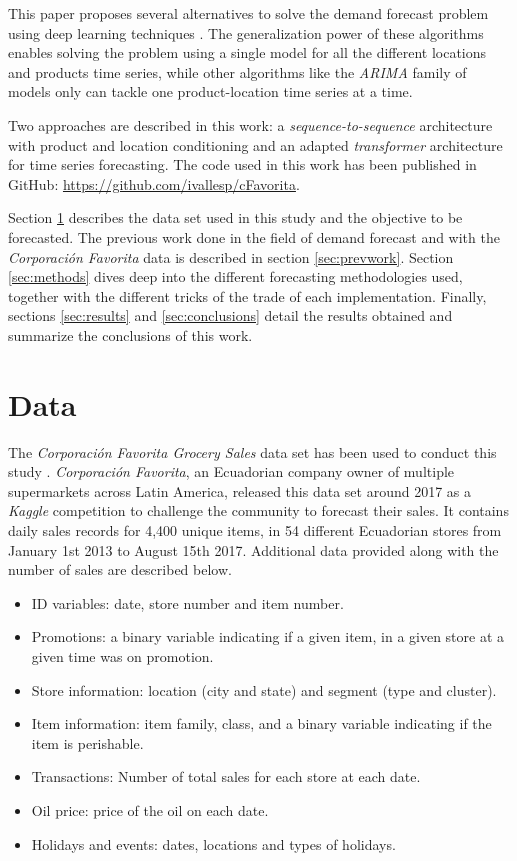 \documentclass{elsarticle}
\begin{document}
	This paper proposes several alternatives to solve the demand forecast problem using deep learning techniques \cite{Goodfellow2016}. The generalization power of these algorithms enables solving the problem using a single model for all the different locations and products time series, while other algorithms like the \textit{ARIMA} family of models \cite{Hyndman2018} only can tackle one product-location time series at a time. 
	
	Two approaches are described in this work: a \textit{sequence-to-sequence} architecture with product and location conditioning and an adapted \textit{transformer} architecture for time series forecasting. The code used in this work has been published in GitHub: \url{https://github.com/ivallesp/cFavorita}.
	
	 Section \ref{sec:data} describes the data set used in this study and the objective to be forecasted. The previous work done in the field of demand forecast and with the \textit{Corporación Favorita} data is described in section \ref{sec:prevwork}. Section \ref{sec:methods} dives deep into the different forecasting methodologies used, together with the different tricks of the trade of each implementation. 
	Finally, sections \ref{sec:results} and \ref{sec:conclusions} detail the results obtained and summarize the conclusions of this work.
	
	
	\section{Data} \label{sec:data}
	The \textit{Corporación Favorita Grocery Sales} data set  has been used to conduct this study \cite{corporacionfavoritadataset2018}. \textit{Corporación Favorita}, an Ecuadorian company owner of multiple supermarkets across Latin America, released this data set around 2017 as a \textit{Kaggle} competition to challenge the community to forecast their sales. It contains daily sales records for 4,400 unique items, in 54 different Ecuadorian stores from January 1st 2013 to August 15th 2017. Additional data provided along with the number of sales are described below.
	
	\begin{itemize}
		\item ID variables: date, store number and item number.
		\item Promotions: a binary variable indicating if a given item, in a given store at a given time was on promotion.
		\item Store information: location (city and state) and segment (type and cluster).
		\item Item information: item family, class, and a binary variable indicating if the item is perishable.
		\item Transactions: Number of total sales for each store at each date.
		\item Oil price: price of the oil on each date.
		\item Holidays and events: dates, locations and types of holidays.
	\end{itemize}
	
\end{document}

